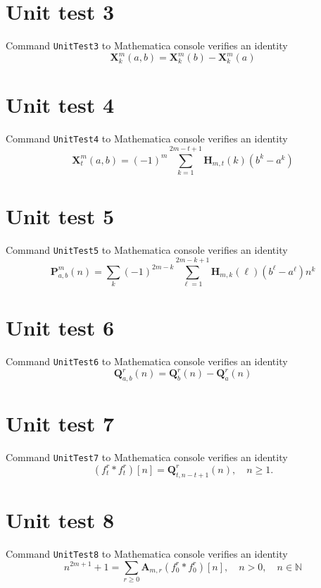 \documentclass[12pt, letterpaper]{amsart}
\theoremstyle{definition}
\theoremstyle{remark}
\numberwithin{equation}{section}
\begin{document}
\section*{Unit test 3}
Command \verb"UnitTest3" to Mathematica console verifies an identity
\begin{equation*}
\mathbf{X}^{m}_{k}(a,b)=\mathbf{X}^{m}_{k}(b) - \mathbf{X}^{m}_{k}(a)
\end{equation*}
\section*{Unit test 4}
Command \verb"UnitTest4" to Mathematica console verifies an identity
\begin{equation*}
\mathbf{X}^{m}_{t}(a,b) = (-1)^m \sum_{k=1}^{2 m - t + 1}\mathbf{H}_{m,t}(k) (b^k - a^k)
\end{equation*}
\section*{Unit test 5}
Command \verb"UnitTest5" to Mathematica console verifies an identity
\begin{equation*}
\mathbf{P}^{m}_{a,b}(n) = \sum_{k} (-1)^{2m-k} \sum_{\ell=1}^{2m-k+1} \mathbf{H}_{m,k}(\ell)(b^\ell - a^\ell)n^k
\end{equation*}
\section*{Unit test 6}
Command \verb"UnitTest6" to Mathematica console verifies an identity
\begin{equation*}
\mathbf{Q}^{r}_{a,b}(n) = \mathbf{Q}^{r}_{b}(n) - \mathbf{Q}^{r}_{a}(n)
\end{equation*}
\section*{Unit test 7}
Command \verb"UnitTest7" to Mathematica console verifies an identity
\begin{equation*}
(f_{t}^{r} \ast f_{t}^{r})[n]  = \mathbf{Q}_{t,n-t+1}^r(n), \quad n\geq 1.
\end{equation*}
\section*{Unit test 8}
Command \verb"UnitTest8" to Mathematica console verifies an identity
\begin{equation*}
n^{2m+1} + 1 = \sum_{r\geq 0} \mathbf{A}_{m,r} (f_{0}^{r} \ast f_{0}^{r})[n], \quad n>0, \quad n\in\mathbb{N}
\end{equation*}
\end{document}
